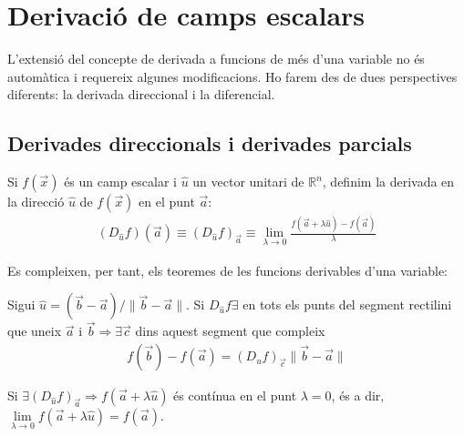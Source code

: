 \section{Derivació de camps escalars}
L'extensió del concepte de derivada a funcions de més d'una variable no és automàtica i requereix algunes modificacions. Ho farem des de dues perspectives diferents: la derivada direccional i la diferencial.

\subsection{Derivades direccionals i derivades parcials}
\begin{defi}
    Si $f(\vec{x})$ és un camp escalar i $\hat{u}$ un vector unitari de $\mathbb{R}^{n}$, definim la derivada en la direcció $\hat{u}$ de $f(\vec{x})$ en el punt $\vec{a}$:
    \begin{align}
        (D_{\hat{u}} f) (\vec{a}) \equiv (D_{\hat{u}} f)_{\vec{a}} \equiv \lim_{\lambda \to 0} \frac{f(\vec{a} + \lambda \hat{u}) - f(\vec{a})}{\lambda}
    \end{align}
\end{defi}
Es compleixen, per tant, els teoremes de les funcions derivables d'una variable:
\begin{thm}\label{thm-tmv}
    Sigui $\hat{u} = (\vec{b} - \vec{a})/\| \vec{b} - \vec{a} \|$. Si $D_{\hat{u}} f \exists$ en tots els punts del segment rectilini que uneix $\vec{a}$ i $\vec{b} \Rightarrow \exists \vec{c}$ dins aquest segment que compleix
    \begin{align*}
        f(\vec{b}) - f(\vec{a}) = (D_{\hat{u}} f)_{\vec{c}} \| \vec{b} - \vec{a} \|
    \end{align*}
\end{thm}
\begin{thm}
    Si $\exists (D_{\hat{u}} f)_{\vec{a}} \Rightarrow f(\vec{a} + \lambda \hat{u})$ és contínua en el punt $\lambda = 0$, és a dir, $\lim\limits_{\lambda \to 0} f(\vec{a} + \lambda \hat{u}) = f(\vec{a})$.
\end{thm}


